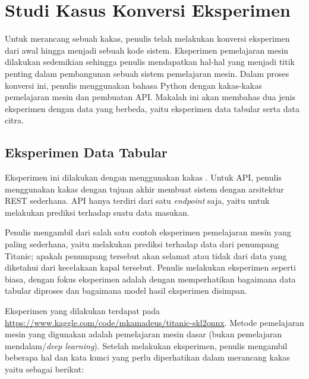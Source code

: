 \section{Studi Kasus Konversi Eksperimen}

Untuk merancang sebuah kakas, penulis telah melakukan konversi eksperimen dari awal hingga menjadi sebuah kode sistem.
Eksperimen pemelajaran mesin dilakukan sedemikian sehingga penulis mendapatkan hal-hal yang menjadi titik penting dalam pembangunan sebuah sistem pemelajaran mesin.
Dalam proses konversi ini, penulis menggunakan bahasa Python dengan kakas-kakas pemelajaran mesin dan pembuatan API\@.
Makalah ini akan membahas dua jenis eksperimen dengan data yang berbeda, yaitu eksperimen data tabular serta data citra.

\subsection{Eksperimen Data Tabular}\label{section:03-tabular-experiment}

Eksperimen ini dilakukan dengan menggunakan kakas .
Untuk API, penulis menggunakan kakas  dengan tujuan akhir membuat sistem dengan arsitektur REST sederhana.
API hanya terdiri dari satu \textit{endpoint} saja, yaitu untuk melakukan prediksi terhadap suatu data masukan.

Penulis mengambil dari salah satu contoh eksperimen pemelajaran mesin yang paling sederhana, yaitu melakukan prediksi terhadap data dari penumpang Titanic; apakah penumpang tersebut akan selamat atau tidak dari data yang diketahui dari kecelakaan kapal tersebut.
Penulis melakukan eksperimen seperti biasa, dengan fokus eksperimen adalah dengan memperhatikan bagaimana data tabular diproses dan bagaimana model hasil eksperimen disimpan.

Eksperimen yang dilakukan terdapat pada \url{https://www.kaggle.com/code/mkamadeus/titanic-skl2onnx}.
Metode pemelajaran mesin yang digunakan adalah pemelajaran mesin dasar (bukan pemelajaran mendalam/\textit{deep learning}).
Setelah melakukan eksperimen, penulis mengambil beberapa hal dan kata kunci yang perlu diperhatikan dalam merancang kakas yaitu sebagai berikut:


